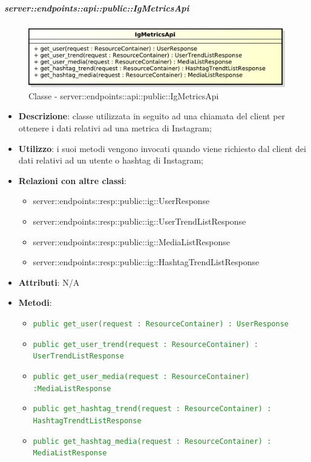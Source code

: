     \subparagraph{server::endpoints::api::public::IgMetricsApi} %
    \label{subp:bdsm_app_server_endpoints_api_public_igmetricsapi}
	\begin{figure}[!htbp]
		\centering
		\centerline{\includegraphics[scale=0.6]{./images/server/classes/endpoints/ig_metrics_api.pdf}}
		\caption{Classe - server::endpoints::api::public::IgMetricsApi}
	\end{figure}
    \begin{itemize}
      \item \textbf{Descrizione}: classe utilizzata in seguito ad una chiamata del client per ottenere i dati relativi ad una metrica di Instagram;
      \item \textbf{Utilizzo}: i suoi metodi vengono invocati quando viene richiesto dal client dei dati relativi ad un utente o hashtag di Instagram;
      \item \textbf{Relazioni con altre classi}:
        \begin{itemize}
          \item server::endpoints::resp::public::ig::UserResponse
          \item server::endpoints::resp::public::ig::UserTrendListResponse
          \item server::endpoints::resp::public::ig::MediaListResponse
          \item server::endpoints::resp::public::ig::HashtagTrendListResponse
        \end{itemize}
		\item \textbf{Attributi}: N/A
		\item \textbf{Metodi}:
			\begin{itemize}
				\item \textcolor{forestgreen}{\texttt{public get\_user(request : ResourceContainer) : UserResponse}}
				\item \textcolor{forestgreen}{\texttt{public get\_user\_trend(request : ResourceContainer) : UserTrendListResponse}}
				\item \textcolor{forestgreen}{\texttt{public get\_user\_media(request : ResourceContainer) :MediaListResponse}}
				\item \textcolor{forestgreen}{\texttt{public get\_hashtag\_trend(request : ResourceContainer) : HashtagTrendtListResponse}}
				\item \textcolor{forestgreen}{\texttt{public get\_hashtag\_media(request : ResourceContainer) : MediaListResponse}}
			\end{itemize}
      \end{itemize}

